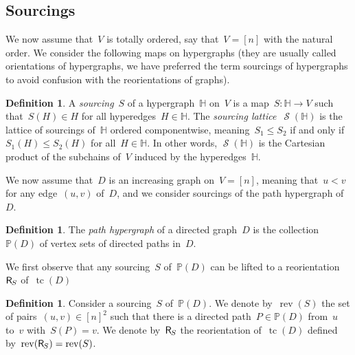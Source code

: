 \documentclass{amsart}
\theoremstyle{definition}
\newtheorem{definition}[theorem]{Definition}
\DeclareMathOperator{\tc}{tc} %
\newcommand{\darkblue}{\color{darkblue}} %
\newcommand{\defn}[1]{\textsl{\darkblue #1}} %
\newcommand{\Vincent}[1]{\todo[size=\tiny,color=blue!30]{ #1 \\ \hfill --- V.}\,}
\newcommand{\mymap}[2]{\mathsf{#1}_{\hspace{-.7pt}#2}}
\newcommand{\reori}[1]{\mymap{R}{#1}}  %
\DeclareMathOperator{\rev}{rev} %
\DeclareMathOperator{\Sour}{\mathcal{S}}  %
\newcommand{\HH}{\mathbb H}  %
\newcommand{\II}{\mathbb I} %
\newcommand{\PP}{\mathbb P} %
\begin{document}
\subsection{Sourcings}
\label{subsec:sourcings}

We now assume that~$V$ is totally ordered, say that~$V = [n]$ with the natural order.
We consider the following maps on hypergraphs (they are usually called orientations of hypergraphs, we have preferred the term sourcings of hypergraphs to avoid confusion with the reorientations of graphs).

\begin{definition}
\label{def:Sour}
A \defn{sourcing}~$S$ of a hypergraph~$\HH$ on~$V$ is a map~$S : \HH \to V$ such that~$S(H) \in H$ for all hyperedges~$H \in \HH$.
The \defn{sourcing lattice}~$\Sour(\HH)$ is the lattice of sourcings of~$\HH$ ordered componentwise, meaning~$S_1 \le S_2$ if and only if~$S_1(H) \le S_2(H)$ for all~$H \in \HH$.
In other words, $\Sour(\HH)$ is the Cartesian product of the subchains of~$V$ induced by the hyperedges~$\HH$.
\end{definition}

%

We now assume that~$D$ is an increasing graph on~$V = [n]$, meaning that~$u < v$ for any edge~$(u,v)$ of~$D$, and we consider sourcings of the path hypergraph of~$D$.

\begin{definition}
\label{def:pathHypergraph}
The \defn{path hypergraph} of a directed graph~$D$ is the collection~$\PP(D)$ of vertex sets of directed paths in~$D$.
\end{definition}

We first observe that any sourcing~$S$ of~$\PP(D)$ can be lifted to a reorientation~$\reori{S}$ of~$\tc(D)$

\begin{definition}
\label{def:Sour2Reori}
Consider a sourcing~$S$ of~$\PP(D)$.
We denote by~$\rev(S)$ the set of pairs~$(u,v) \in [n]^2$ such that there is a directed path~$P \in \PP(D)$ from~$u$ to~$v$ with~$S(P) = v$.
We denote by~$\reori{S}$ the reorientation of~$\tc(D)$ defined by~$\rev(\reori{S}) = \rev(S)$.
\end{definition}
\end{document}
